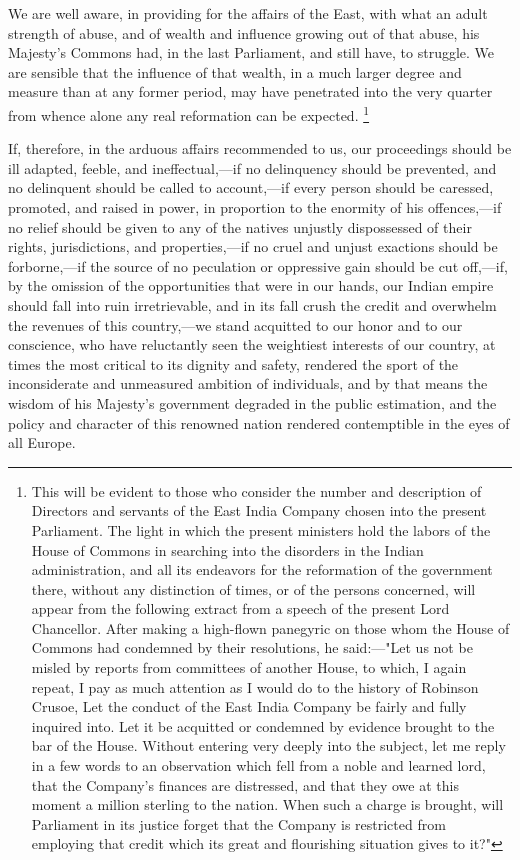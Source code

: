 We are well aware, in providing for the affairs of the East, with what an adult strength of abuse, and of wealth and influence growing out of that abuse, his Majesty's Commons had, in the last Parliament, and still have, to struggle. We are sensible that the influence of that wealth, in a much larger degree and measure than at any former period, may have penetrated into the very quarter from whence alone any real reformation can be expected.
\footnote{ This will be evident to those who consider the number and description of Directors and servants of the East India Company chosen into the present Parliament. The light in which the present ministers hold the labors of the House of Commons in searching into the disorders in the Indian administration, and all its endeavors for the reformation of the government there, without any distinction of times, or of the persons concerned, will appear from the following extract from a speech of the present Lord Chancellor. After making a high-flown panegyric on those whom the House of Commons had condemned by their resolutions, he said:—"Let us not be misled by reports from committees of another House, to which, I again repeat, I pay as much attention as I would do to the history of Robinson Crusoe, Let the conduct of the East India Company be fairly and fully inquired into. Let it be acquitted or condemned by evidence brought to the bar of the House. Without entering very deeply into the subject, let me reply in a few words to an observation which fell from a noble and learned lord, that the Company's finances are distressed, and that they owe at this moment a million sterling to the nation. When such a charge is brought, will Parliament in its justice forget that the Company is restricted from employing that credit which its great and flourishing situation gives to it?"}

If, therefore, in the arduous affairs recommended to us, our proceedings should be ill adapted, feeble, and ineffectual,—if no delinquency should be prevented, and no delinquent should be called to account,—if every person should be caressed, promoted, and raised in power, in proportion to the enormity of his offences,—if no relief should be given to any of the natives unjustly dispossessed of their rights, jurisdictions, and properties,—if no cruel and unjust exactions should be forborne,—if the source of no peculation or oppressive gain should be cut off,—if, by the omission of the opportunities that were in our hands, our Indian empire should fall into ruin irretrievable, and in its fall crush the credit and overwhelm the revenues of this country,—we stand acquitted to our honor and to our conscience, who have reluctantly seen the weightiest interests of our country, at times the most critical to its dignity and safety, rendered the sport of the inconsiderate and unmeasured ambition of individuals, and by that means the wisdom of his Majesty's government degraded in the public estimation, and the policy and character of this renowned nation rendered contemptible in the eyes of all Europe.

